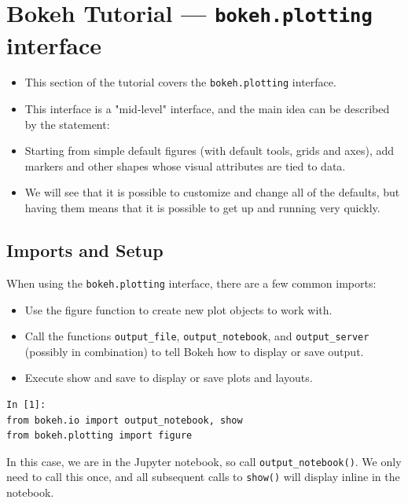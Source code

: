 \documentclass[a4paper,12pt]{article}
\begin{document}
\large
 	
\section{Bokeh Tutorial — \texttt{bokeh.plotting} interface}
\begin{itemize}
\item This section of the tutorial covers the \texttt{bokeh.plotting} interface. 
\item This interface is a "mid-level" interface, and the main idea can be described by the statement:

\item Starting from simple default figures (with default tools, grids and axes), add markers and other shapes whose visual attributes are tied to data.
\item We will see that it is possible to customize and change all of the defaults, but having them means that it is possible to get up and running very quickly.
\end{itemize}


\subsection{Imports and Setup}
When using the \texttt{bokeh.plotting} interface, there are a few common imports:
\begin{itemize}


\item Use the figure function to create new plot objects to work with.
\item Call the functions \texttt{output\_file}, \texttt{output\_notebook}, and \texttt{output\_server} (possibly in combination) to tell Bokeh how to display or save output.
\item Execute show and save to display or save plots and layouts.
\end{itemize}


\begin{framed}
\begin{verbatim}
In [1]:
from bokeh.io import output_notebook, show
from bokeh.plotting import figure
\end{verbatim}
\end{framed}
In this case, we are in the Jupyter notebook, so call \texttt{output\_notebook()}. We only need to call this once, and all subsequent calls to \texttt{show()} will display inline in the notebook.
\end{document}
